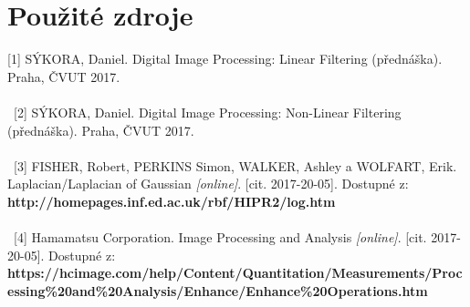 \documentclass[11pt,oneside]{article}
\begin{document}
\section*{Použité zdroje}
[1] SÝKORA, Daniel. Digital Image Processing: Linear Filtering (přednáška). Praha, ČVUT 2017.
\\ \
\\ \
[2] SÝKORA, Daniel. Digital Image Processing: Non-Linear Filtering (přednáška). Praha, ČVUT 2017.
\\ \
\\ \
[3] FISHER, Robert, PERKINS Simon, WALKER, Ashley a WOLFART, Erik. Laplacian/Laplacian of Gaussian \textit{[online]}. [cit. 2017-20-05]. Dostupné z: \textbf{http://homepages.inf.ed.ac.uk/rbf/HIPR2/log.htm}
\\ \
\\ \
[4] Hamamatsu Corporation. Image Processing and Analysis \textit{[online]}. [cit. 2017-20-05]. Dostupné z: \textbf{https://hcimage.com/help/Content/Quantitation/Measurements/\newline Processing\%20and\%20Analysis/Enhance/Enhance\%20Operations.htm}
\end{document}
